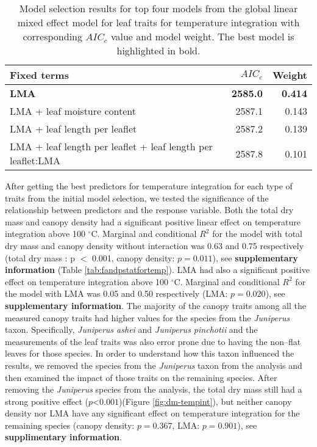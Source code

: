 \documentclass{bmcart}
\begin{document}
\begin{table}
  \centering
  \caption{Model selection results for top four models from the global linear
    mixed effect model for leaf traits for temperature integration with
    corresponding $AIC_{c}$ value and model weight. The best model is highlighted in bold.}
  \begin{tabular}{lrr}
    \toprule
    \textbf{Fixed terms} & $AIC_{c}$ & \textbf{Weight}\\
    \midrule
    \textbf{LMA} & \textbf{2585.0} & \textbf{0.414} \\
    LMA + leaf moisture content & 2587.1     & 0.143    \\
    LMA + leaf length per leaflet                                 & 2587.2 & 0.139    \\
    LMA + leaf length per leaflet + leaf length per leaflet:LMA                              & 2587.8     & 0.101    \\
    \bottomrule
  \end{tabular}
  \label{tab:leaf_models}
\end{table}

After getting the best predictors for temperature integration for each type of traits from the initial model selection, we tested the significance of the relationship  between predictors and the response variable. Both the total dry mass and canopy density had a significant positive linear effect  
on temperature integration above 100 $^{\circ}$C. Marginal and conditional $R^2$ for the model with total dry mass and canopy density without interaction was  0.63 and 0.75 respectively (total dry mass : p $<$ 0.001, canopy density: $p = 0.011$), see \textbf{supplementary information} (Table \ref{tab:fandpstatfortemp}). LMA had also a significant positive effect on temperature integration above 100 $^{\circ}$C. Marginal  and conditional $R^2$ for the model with LMA was 0.05 and 0.50 respectively (LMA: $p = 0.020$), see \textbf{supplementary information}. The majority of the canopy traits among all the measured canopy traits had higher values for the species from the \emph{Juniperus} taxon. Specifically, \emph{Juniperus ashei} and \emph{Juniperus pinchotii} and the measurements of the leaf traits was also error prone due to having the non--flat leaves for those species. In order to understand how this taxon influenced the results, we removed the species from the \emph{Juniperus} taxon from the analysis and then examined the impact of those traits on the remaining species. After removing the \emph{Juniperus} species from the analysis, the total dry mass still had a strong positive effect ($p $<$ 0.001$)(Figure \ref{fig:dm-tempint}), but neither canopy density nor LMA have any significant effect on temperature integration for the remaining species (canopy density: $p = 0.367$, LMA: $p = 0.901$), see \textbf{supplimentary information}. 
\end{document}
